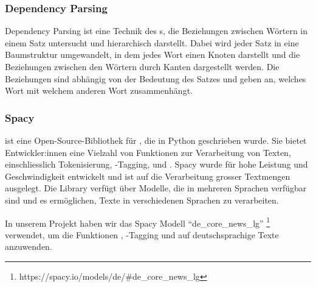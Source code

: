 \subsubsection{Dependency Parsing}

Dependency Parsing ist eine Technik des s, die Beziehungen
zwischen Wörtern in einem Satz untersucht und hierarchisch darstellt.
Dabei wird jeder Satz in eine Baumstruktur umgewandelt, in dem jedes
Wort einen Knoten darstellt und die Beziehungen zwischen den Wörtern durch
Kanten dargestellt werden. Die Beziehungen sind abhängig von der Bedeutung
des Satzes und geben an, welches Wort mit welchem anderen Wort zusammenhängt.

\subsubsection{Spacy}\label{spacy}

 ist eine Open-Source-Bibliothek für , die in Python geschrieben wurde.
Sie bietet Entwickler:innen eine Vielzahl von Funktionen zur Verarbeitung von
Texten, einschliesslich Tokenisierung, -Tagging,  und
. Spacy wurde für hohe Leistung und Geschwindigkeit entwickelt
und ist auf die Verarbeitung grosser Textmengen ausgelegt. Die Library verfügt über Modelle,
die in mehreren Sprachen verfügbar sind und es ermöglichen, Texte in verschiedenen
Sprachen zu verarbeiten.

In unserem Projekt haben wir das Spacy Modell \enquote{de\_core\_news\_lg}
\footnote{https://spacy.io/models/de/\#de\_core\_news\_lg} verwendet, um die
Funktionen , -Tagging und  auf deutschsprachige
Texte anzuwenden.